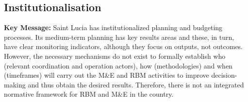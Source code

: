 \documentclass[
  10pt,
]{book}
\begin{document}
\hypertarget{institutionalisation}{%
\subsection{Institutionalisation}\label{institutionalisation}}

\textbf{Key Message:}
Saint Lucia has institutionalized planning and budgeting processes. Its medium-term planning has key results areas and these, in turn, have clear monitoring indicators, although they focus on outputs, not outcomes. However, the necessary mechanisms do not exist to formally establish who (relevant coordination and operation actors), how (methodologies) and when (timeframes) will carry out the M\&E and RBM activities to improve decision-making and thus obtain the desired results. Therefore, there is not an integrated normative framework for RBM and M\&E in the country.

\begingroup\fontsize{12}{14}\selectfont
\end{document}
